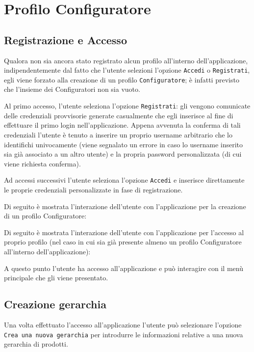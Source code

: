 \section{Profilo Configuratore}

\subsection{Registrazione e Accesso}
Qualora non sia ancora stato registrato alcun profilo all'interno dell'applicazione, indipendentemente dal fatto che l'utente selezioni l'opzione \texttt{Accedi} o \texttt{Registrati}, egli viene forzato alla creazione di un profilo \texttt{Configuratore}; è infatti previsto che l'insieme dei Configuratori non sia vuoto.  

Al primo accesso, l'utente seleziona l'opzione \texttt{Registrati}: gli vengono comunicate delle credenziali provvisorie generate casualmente che egli inserisce al fine di effettuare il primo login nell'applicazione. Appena avvenuta la conferma di tali credenziali l'utente è tenuto a inserire un proprio username arbitrario che lo identifichi univocamente (viene segnalato un errore in caso lo username inserito sia già associato a un altro utente) e la propria password personalizzata (di cui viene richiesta conferma). 

Ad accessi successivi l'utente seleziona l'opzione \texttt{Accedi} e inserisce direttamente le proprie credenziali personalizzate in fase di registrazione. \bigskip

Di seguito è mostrata l'interazione dell'utente con l'applicazione per la creazione di un profilo Configuratore:



Di seguito è mostrata l'interazione dell'utente con l'applicazione per l'accesso al proprio profilo (nel caso in cui sia già presente almeno un profilo Configuratore all'interno dell'applicazione):


A questo punto l'utente ha accesso all'applicazione e può interagire con il menù principale che gli viene presentato.

\subsection{Creazione gerarchia}
Una volta effettuato l'accesso all'applicazione l'utente può selezionare l'opzione \texttt{Crea una nuova gerarchia} per introdurre le informazioni relative a una nuova gerarchia di prodotti. 

